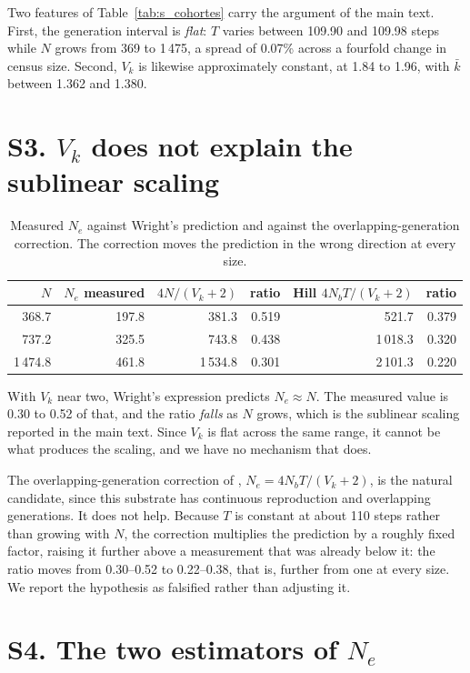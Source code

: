 \documentclass[11pt]{article}
\begin{document}
Two features of Table~\ref{tab:s_cohortes} carry the argument of the
main text. First, the generation interval is \emph{flat}: $T$ varies
between 109.90 and 109.98 steps while $N$ grows from
369 to 1\,475, a spread of
0.07\% across a fourfold change
in census size. Second, $V_k$ is likewise approximately constant, at
1.84 to 1.96, with $\bar{k}$ between
1.362 and 1.380.

\section*{S3. $V_k$ does not explain the sublinear scaling}

\begin{table}[ht]
\centering\small
\caption{Measured $N_e$ against Wright's prediction and against the
overlapping-generation correction. The correction moves the prediction
in the wrong direction at every size.}
\label{tab:s_ne}
\begin{tabular}{rrrrrr}
\toprule
$N$ & $N_e$ measured & $4N/(V_k+2)$ & ratio & Hill $4N_bT/(V_k+2)$ & ratio\\
\midrule
368.7 & 197.8 & 381.3 & 0.519 & 521.7 & 0.379\\
737.2 & 325.5 & 743.8 & 0.438 & 1\,018.3 & 0.320\\
1\,474.8 & 461.8 & 1\,534.8 & 0.301 & 2\,101.3 & 0.220\\
\bottomrule
\end{tabular}
\end{table}

With $V_k$ near two, Wright's expression predicts $N_e \approx N$. The
measured value is 0.30 to 0.52 of that, and the
ratio \emph{falls} as $N$ grows, which is the sublinear scaling
reported in the main text. Since $V_k$ is flat across the same range,
it cannot be what produces the scaling, and we have no mechanism that
does.

The overlapping-generation correction of \citet{hill1972}, $N_e =
4 N_b T / (V_k + 2)$, is the natural candidate, since this substrate has
continuous reproduction and overlapping generations. It does not help.
Because $T$ is constant at about 110 steps rather
than growing with $N$, the correction multiplies the prediction by a
roughly fixed factor, raising it further above a measurement that was
already below it: the ratio moves from
0.30--0.52 to 0.22--0.38,
that is, further from one at every size. We report the hypothesis as
falsified rather than adjusting it.

\section*{S4. The two estimators of $N_e$}
\end{document}
